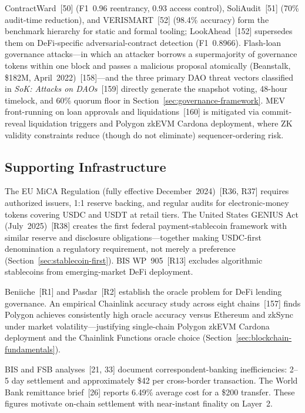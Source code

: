 \documentclass[12pt,a4paper]{report}
\begin{document}
ContractWard~[50] (F1~0.96 reentrancy, 0.93 access control), SoliAudit~[51] (70\% audit-time reduction), and VERISMART~[52] (98.4\% accuracy) form the benchmark hierarchy for static and formal tooling; LookAhead~[152] supersedes them on DeFi-specific adversarial-contract detection (F1~0.8966). Flash-loan governance attacks---in which an attacker borrows a supermajority of governance tokens within one block and passes a malicious proposal atomically (Beanstalk, \$182M, April~2022)~[158]---and the three primary DAO threat vectors classified in \textit{SoK: Attacks on DAOs}~[159] directly generate the snapshot voting, 48-hour timelock, and 60\% quorum floor in Section~\ref{sec:governance-framework}. MEV front-running on loan approvals and liquidations~[160] is mitigated via commit-reveal liquidation triggers and Polygon zkEVM Cardona deployment, where ZK validity constraints reduce (though do not eliminate) sequencer-ordering risk.

\subsection{Supporting Infrastructure}
\label{sec:lit-stablecoin-reg}
\label{sec:lit-sbt}
\label{sec:lit-institutional}

The EU MiCA Regulation (fully effective December~2024)~[R36, R37] requires authorized issuers, 1{:}1 reserve backing, and regular audits for electronic-money tokens covering USDC and USDT at retail tiers. The United States GENIUS Act (July~2025)~[R38] creates the first federal payment-stablecoin framework with similar reserve and disclosure obligations---together making USDC-first denomination a regulatory requirement, not merely a preference (Section~\ref{sec:stablecoin-first}). BIS WP~905~[R13] excludes algorithmic stablecoins from emerging-market DeFi deployment.

Beniiche~[R1] and Pasdar~[R2] establish the oracle problem for DeFi lending governance. An empirical Chainlink accuracy study across eight chains~[157] finds Polygon achieves consistently high oracle accuracy versus Ethereum and zkSync under market volatility---justifying single-chain Polygon zkEVM Cardona deployment and the Chainlink Functions oracle choice (Section~\ref{sec:blockchain-fundamentals}).

BIS and FSB analyses~[21, 33] document correspondent-banking inefficiencies: 2--5 day settlement and approximately \$42 per cross-border transaction. The World Bank remittance brief~[26] reports 6.49\% average cost for a \$200 transfer. These figures motivate on-chain settlement with near-instant finality on Layer~2.
\end{document}
